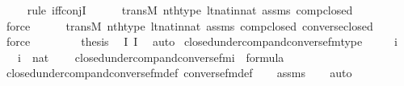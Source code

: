 \begin{isabellebody}
\ \ \ \ \isamarkupfalse%
{\isacharparenleft}{\kern0pt}rule\ iff{\isacharunderscore}{\kern0pt}conjI{\isacharparenright}{\kern0pt}\isanewline
\ \ \ \ \isamarkupfalse%
\ transM\ nth{\isacharunderscore}{\kern0pt}type\ lt{\isacharunderscore}{\kern0pt}nat{\isacharunderscore}{\kern0pt}in{\isacharunderscore}{\kern0pt}nat\ assms\ comp{\isacharunderscore}{\kern0pt}closed\isanewline
\ \ \ \ \ \isamarkupfalse%
\ force\isanewline
\ \ \ \ \isamarkupfalse%
\ transM\ nth{\isacharunderscore}{\kern0pt}type\ lt{\isacharunderscore}{\kern0pt}nat{\isacharunderscore}{\kern0pt}in{\isacharunderscore}{\kern0pt}nat\ assms\ comp{\isacharunderscore}{\kern0pt}closed\ converse{\isacharunderscore}{\kern0pt}closed\ \isanewline
\ \ \ \ \isamarkupfalse%
\ force\isanewline
\ \ \ \ \isamarkupfalse%
\isanewline
\ \ \isamarkupfalse%
\ {\isacharquery}{\kern0pt}thesis\ \isamarkupfalse%
\ I{}\ I{}\ \isamarkupfalse%
\ auto\isanewline
{}\isamarkupfalse%
%
\endisatagproof
{\isafoldproof}%
%
\isadelimproof
\isanewline
%
\endisadelimproof
\isanewline
{}\isamarkupfalse%
\ closed{\isacharunderscore}{\kern0pt}under{\isacharunderscore}{\kern0pt}comp{\isacharunderscore}{\kern0pt}and{\isacharunderscore}{\kern0pt}converse{\isacharunderscore}{\kern0pt}fm{\isacharunderscore}{\kern0pt}type\ {\isacharcolon}{\kern0pt}\ \isanewline
\ \ \ i\ \isanewline
\ \ \ {\isachardoublequoteopen}i\ {\isasymin}\ nat{\isachardoublequoteclose}\ \isanewline
\ \ \ {\isachardoublequoteopen}closed{\isacharunderscore}{\kern0pt}under{\isacharunderscore}{\kern0pt}comp{\isacharunderscore}{\kern0pt}and{\isacharunderscore}{\kern0pt}converse{\isacharunderscore}{\kern0pt}fm{\isacharparenleft}{\kern0pt}i{\isacharparenright}{\kern0pt}\ {\isasymin}\ formula{\isachardoublequoteclose}\ \isanewline
%
\isadelimproof
\ \ %
\endisadelimproof
%
\isatagproof
{}\isamarkupfalse%
\ closed{\isacharunderscore}{\kern0pt}under{\isacharunderscore}{\kern0pt}comp{\isacharunderscore}{\kern0pt}and{\isacharunderscore}{\kern0pt}converse{\isacharunderscore}{\kern0pt}fm{\isacharunderscore}{\kern0pt}def\ converse{\isacharunderscore}{\kern0pt}fm{\isacharunderscore}{\kern0pt}def\isanewline
\ \ \isamarkupfalse%
\ assms\isanewline
\ \ \isamarkupfalse%
\ auto%
\endisatagproof
{\isafoldproof}%
%
\isadelimproof
\isanewline
%
\endisadelimproof
\isanewline
{}\isamarkupfalse%

\end{isabellebody}
